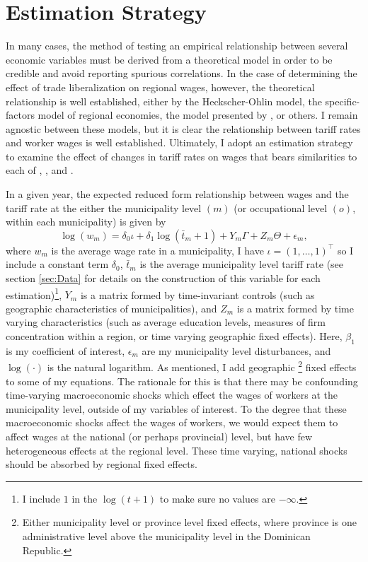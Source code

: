 \documentclass[12pt]{article}
\begin{document}
\vspace{-10pt}
\section{Estimation Strategy}
\label{sec:Model}
In many cases, the method of testing an empirical relationship between several economic variables must 
be derived from a theoretical model in order to be credible and avoid reporting spurious correlations.
In the case of determining the effect of trade liberalization on regional wages, however, the theoretical
relationship is well established, either by the Heckscher-Ohlin model,
the specific-factors model of regional economies, the model presented by \citeauthor{amiti}, or 
others. I remain agnostic between these models, but it is clear the relationship between tariff rates
and worker wages is well established. Ultimately, I adopt an estimation strategy to examine the 
effect of changes in tariff rates on wages that bears similarities to each of \citet{kovak}, 
\citet{amiti}, and \citet{amiti2012trade}. 

In a given year, the expected reduced form relationship between wages and the tariff rate at the either
the municipality level $(m)$ (or occupational level $(o)$, within each municipality) is given by 
\begin{equation}
\label{eq:Equation1}
\log(w_m) = \delta_0 \iota + \delta_1 \log(\bar{t}_{m}+1)+Y_m \Gamma + Z_m \Theta + \epsilon_m,
\end{equation}
where $w_m$ is the average wage rate in a municipality, 
I have $\iota = (1,\dots,1)^{\top}$ so I include a constant term $\delta_0$, 
$\bar{t}_{m}$ is the average municipality level tariff rate (see section \ref{sec:Data} for details on 
the construction of this variable for each estimation)\footnote{I include $1$ in the $\log(t+1)$
to make sure no values are $-\infty$.}, $Y_m$ is a matrix
formed by time-invariant controls (such as geographic characteristics of municipalities), and 
$Z_m$ is a matrix formed by time varying characteristics (such as average education levels, 
measures of firm concentration within a region, or time varying geographic fixed effects).
Here, $\beta_1$ is my coefficient of interest, $\epsilon_m$ are my municipality level 
disturbances, and $\log(\cdot)$ is the natural logarithm. As mentioned, I add geographic
\footnote{Either municipality level or province level fixed effects,
where province is one administrative level above the municipality level in the Dominican Republic.} 
fixed effects to some of my equations. The rationale for this is that there may be confounding 
time-varying macroeconomic shocks which effect the wages of workers at the municipality level, outside
of my variables of interest. To the degree that these macroeconomic shocks affect the
wages of workers, we would expect them to affect wages at the national (or perhaps provincial) level,
but have few heterogeneous effects at the regional level. These time varying, national shocks 
should be absorbed by regional fixed effects.
\end{document}
